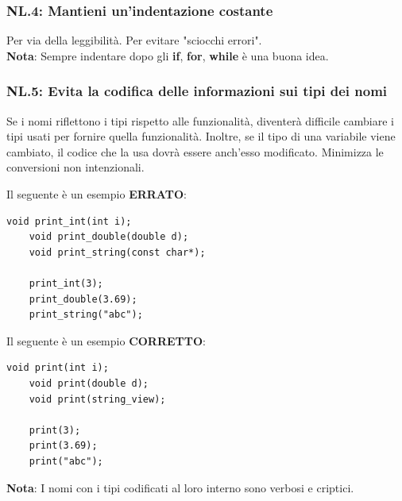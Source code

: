 \subsubsection{NL.4: Mantieni un'indentazione costante}

\textsf{\small Per via della leggibilità. Per evitare "sciocchi errori".} \\

\textsf{\small \textbf{Nota}: Sempre indentare dopo gli \textbf{if}, \textbf{for}, \textbf{while} è una buona idea.} \\

\subsubsection{NL.5: Evita la codifica delle informazioni sui tipi dei nomi} %

\textsf{\small Se i nomi riflettono i tipi rispetto alle funzionalità, diventerà difficile cambiare i tipi usati per fornire quella funzionalità. Inoltre, se il tipo di una variabile viene cambiato, il codice che la usa dovrà essere anch'esso modificato. Minimizza le conversioni non intenzionali.} \break

\textsf{\small Il seguente è un esempio \textbf{\color{red} ERRATO}\normalcolor:} \\


\begin{lstlisting}[frame=single, rulecolor=\color{red}]
	void print_int(int i);
	void print_double(double d);
	void print_string(const char*);
	
	print_int(3);
	print_double(3.69);
	print_string("abc");
\end{lstlisting}

\textsf{\small Il seguente è un esempio \textbf{\color{ForestGreen} CORRETTO}\normalcolor:} \\

\begin{lstlisting}[frame=single, rulecolor=\color{ForestGreen}]
	void print(int i);
	void print(double d);
	void print(string_view);
	
	print(3);
	print(3.69);
	print("abc");
\end{lstlisting}

\textsf{\small \textbf{Nota}: I nomi con i tipi codificati al loro interno sono verbosi e criptici.} \\

